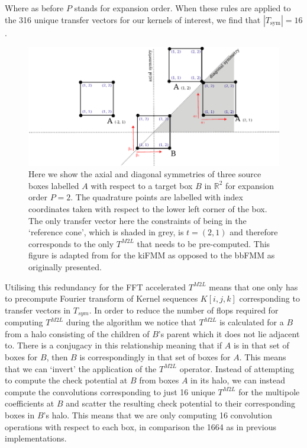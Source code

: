 Where as before $P$ stands for expansion order. When these rules are applied to the 316 unique transfer vectors for our kernels of interest, we find that $|T_{\text{sym}}|  = 16$.

\begin{figure}
    \centering
    \includegraphics[width=\textwidth]{images/ch_3/symmetries.pdf}
    \caption{Here we show the axial and diagonal symmetries of three source boxes labelled $A$ with respect to a target box $B$ in $\mathbb{R}^2$ for expansion order $P=2$. The quadrature points are labelled with index coordinates taken with respect to the lower left corner of the box. The only transfer vector here the constraints of being in the `reference cone', which is shaded in grey, is $t=(2, 1)$ and therefore corresponds to the only $T^{M2L}$ that needs to be pre-computed. This figure is adapted from \cite{messner2012optimized} for the kiFMM as opposed to the bbFMM as originally presented.}
    \label{fig:chpt:3:sec:1:subsec:2:symmetries}
\end{figure}

Utilising this redundancy for the FFT accelerated $T^{M2L}$ means that one only has to precompute Fourier transform of Kernel sequences $K[i, j, k]$ corresponding to transfer vectors in $T_{\textit{sym}}$. In order to reduce the number of flops required for computing $T^{M2L}$ during the algorithm we notice that $T^{M2L}$ is calculated for a $B$ from a halo consisting of the children of $B$'s parent which it does not lie adjacent to. There is a conjugacy in this relationship meaning that if $A$ is in that set of boxes for $B$, then $B$ is correspondingly in that set of boxes for $A$. This means that we can `invert' the application of the $T^{M2L}$ operator. Instead of attempting to compute the check potential at $B$ from boxes $A$ in its halo, we can instead compute the convolutions corresponding to just 16 unique $T^{M2L}$ for the multipole coefficients at $B$ and scatter the resulting check potential to their corresponding boxes in $B$'s halo. This means that we are only computing 16 convolution operations with respect to each box, in comparison the 1664 as in previous implementations.

